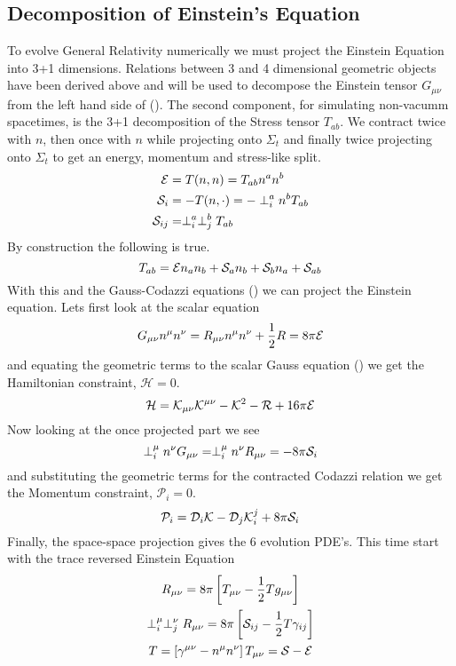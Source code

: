 \subsection{Decomposition of Einstein's Equation}
To evolve General Relativity numerically we must project the Einstein Equation into 3+1 dimensions. Relations between 3 and 4 dimensional geometric objects have been derived above and will be used to decompose the Einstein tensor $G_{\mu\nu}$ from the left hand side of (). The second component, for simulating non-vacumm spacetimes, is the 3+1 decomposition of the Stress tensor $T_{ab}$. We contract twice with $n$, then once with $n$ while projecting onto $\Sigma_t$ and finally twice projecting onto $\Sigma_t$ to get an energy, momentum and stress-like split.
\begin{align} \mathcal{E} &= T(n,n) = T_{ab}n^an^b\\
 \S_i &= -T(n,\cdot) = -\perp_i^a n^b T_{ab}\\
\S_{ij} &= \perp^a_i\perp^b_j T_{ab}\end{align}
By construction the following is true.
\begin{equation} T_{ab} = \mathcal{E} n_a n_b + \S_a n_b + \S_b n_a + \S_{ab}\end{equation}
With this and the Gauss-Codazzi equations () we can project the Einstein equation. Lets first look at the scalar equation
\begin{equation} G_{\mu\nu}n^\mu n^\nu = R_{\mu\nu}n^\mu n^\nu + \frac{1}{2}R = 8\pi \E\end{equation}
and equating the geometric terms to the scalar Gauss equation () we get the Hamiltonian constraint, $\mathcal{H}=0$.
\begin{equation}\mathcal{H} = \K_{\mu\nu}\K^{\mu\nu}-\K^2 -\R + 16\pi \E  \end{equation}
Now looking at the once projected part we see
\begin{equation} \perp^\mu_i n^\nu G_{\mu\nu} =  \perp^\mu_i n^\nu R_{\mu\nu} = -8\pi\S_i\end{equation}
and substituting the geometric terms for the contracted Codazzi relation we get the Momentum constraint, $\mathcal{P}_i = 0$.
\begin{equation} \mathcal{P}_i = \D_i \K - \D_j\K^j_i  + 8\pi \S_i\end{equation}
Finally, the space-space projection gives the 6 evolution PDE's. This time start with the trace reversed Einstein Equation
\begin{gather*} R_{\mu\nu} = 8 \pi \left[T_{\mu\nu} - \frac{1}{2}Tg_{\mu\nu}\right]\\
\perp^\mu_i\perp^\nu_jR_{\mu\nu} = 8 \pi \left[\S_{ij} - \frac{1}{2}T\gamma_{ij}\right]\\
T = \left[ \gamma^{\mu\nu} - n^\mu n^\nu\right]T_{\mu\nu} = \S-\E\end{gather*}
